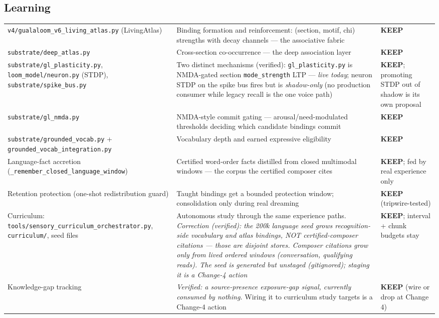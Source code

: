 \documentclass[11pt]{article}
\newcommand{\keep}{\textbf{KEEP}}
\begin{document}
\subsection{Learning}
\begin{longtable}{p{} p{} p{}}
\toprule
\texttt{v4/gualaloom\_v6\_living\_atlas.py} (LivingAtlas) &
Binding formation and reinforcement: (section, motif, chi) strengths with
decay channels — the associative fabric &
\keep{} \\
\texttt{substrate/deep\_atlas.py} &
Cross-section co-occurrence — the deep association layer &
\keep{} \\
\texttt{substrate/gl\_plasticity.py}, \texttt{loom\_model/neuron.py}
(STDP), \texttt{substrate/spike\_bus.py} &
Two distinct mechanisms (verified): \texttt{gl\_plasticity.py} is
NMDA-gated section \texttt{mode\_strength} LTP — \emph{live today};
neuron STDP on the spike bus fires but is \emph{shadow-only} (no
production consumer while legacy recall is the one voice path) &
\keep{}; promoting STDP out of shadow is its own proposal \\
\texttt{substrate/gl\_nmda.py} &
NMDA-style commit gating — arousal/need-modulated thresholds deciding
which candidate bindings commit &
\keep{} \\
\texttt{substrate/grounded\_vocab.py} +
\texttt{grounded\_vocab\_integration.py} &
Vocabulary depth and earned expressive eligibility &
\keep{} \\
Language-fact accretion (\texttt{\_remember\_closed\_language\_window}) &
Certified word-order facts distilled from closed multimodal windows — the
corpus the certified composer cites &
\keep{}; fed by real experience only \\
Retention protection (one-shot redistribution guard) &
Taught bindings get a bounded protection window; consolidation only during
real dreaming &
\keep{} (tripwire-tested) \\
Curriculum: \texttt{tools/sensory\_curriculum\_orchestrator.py},
\texttt{curriculum/}, seed files &
Autonomous study through the same experience paths. \emph{Correction
(verified): the 200k language seed grows recognition-side vocabulary and
atlas bindings, NOT certified-composer citations — those are disjoint
stores. Composer citations grow only from lived ordered windows
(conversation, qualifying reads). The seed is generated but unstaged
(gitignored); staging it is a Change-4 action} &
\keep{}; interval + chunk budgets stay \\
Knowledge-gap tracking &
\emph{Verified: a source-presence exposure-gap signal, currently
consumed by nothing.} Wiring it to curriculum study targets is a
Change-4 action &
\keep{} (wire or drop at Change 4) \\
\bottomrule
\end{longtable}
\end{document}
